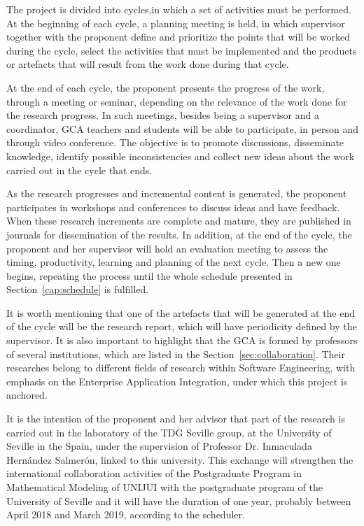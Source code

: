 \label{cap:methodology}
\noindent 
The project is divided into cycles,in which a set of activities must be performed. At the beginning of each cycle, a planning meeting is held, in which supervisor together with the proponent define and prioritize the points that will be worked during the cycle, select the activities that must be implemented and the products or artefacts that will result from the work done during that cycle.

At the end of each cycle, the proponent presents the progress of the work, through a meeting or seminar, depending on the relevance of the work done for the research progress. In such meetings, besides being a supervisor and a coordinator, GCA teachers and students will be able to participate, in person and through video conference. The objective is to promote discussions, disseminate knowledge, identify possible inconsistencies and collect new ideas about the work carried out in the cycle that ends. 

As the research progresses and incremental content is generated, the proponent participates in workshops and conferences to discuss ideas and have feedback. When these research increments are complete and mature, they are published in journals for dissemination of the results.
In addition, at the end of the cycle, the proponent and her supervisor will hold an evaluation meeting to assess the timing, productivity, learning and planning of the next cycle.
Then a new one begins, repeating the process until the whole schedule presented in Section~\ref{cap:schedule} is fulfilled.

It is worth mentioning that one of the artefacts that will be generated at the end of the cycle will be the research report, which will have periodicity defined by the supervisor.
It is also important to highlight that the GCA is formed by professors of several institutions, which are listed in the Section~\ref{sec:collaboration}. Their researches belong to different fields of research within Software Engineering, with emphasis on the Enterprise Application Integration, under which this project is anchored.

It is the intention of the proponent and her advisor that part of the research is carried out in the laboratory of the TDG Seville group, at the University of Seville in the Spain, under the supervision of Professor Dr. Inmaculada Hernández Salmerón, linked to this university. This exchange will strengthen the international collaboration activities of the Postgraduate Program in Mathematical Modeling of UNIJUI with the postgraduate program of the University of Seville and it will have the duration of one year, probably between April 2018 and March 2019, according to the scheduler.

